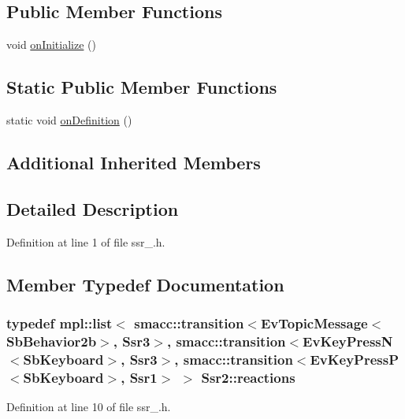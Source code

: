\subsection*{Public Member Functions}
\begin{DoxyCompactItemize}
\item 
void \hyperlink{structSsr2_a2cf5995600fcc702887dde10aee84902}{on\+Initialize} ()
\end{DoxyCompactItemize}
\subsection*{Static Public Member Functions}
\begin{DoxyCompactItemize}
\item 
static void \hyperlink{structSsr2_ab5924184e178dac57b8f6737bb61cbc6}{on\+Definition} ()
\end{DoxyCompactItemize}
\subsection*{Additional Inherited Members}


\subsection{Detailed Description}


Definition at line 1 of file ssr\+\_.\+h.



\subsection{Member Typedef Documentation}
\subsubsection[{\texorpdfstring{reactions}{reactions}}]{\setlength{\rightskip}{0pt plus 5cm}typedef mpl\+::list$<$ {\bf smacc\+::transition}$<$Ev\+Topic\+Message$<$Sb\+Behavior2b$>$, {\bf Ssr3}$>$, {\bf smacc\+::transition}$<$Ev\+Key\+PressN$<$Sb\+Keyboard$>$, {\bf Ssr3}$>$, {\bf smacc\+::transition}$<$Ev\+Key\+PressP$<$Sb\+Keyboard$>$, {\bf Ssr1}$>$ $>$ {\bf Ssr2\+::reactions}}\hypertarget{structSsr2_a1256e60dc7ca7df354864b8ebf9a5140}{}\label{structSsr2_a1256e60dc7ca7df354864b8ebf9a5140}


Definition at line 10 of file ssr\+\_.\+h.



